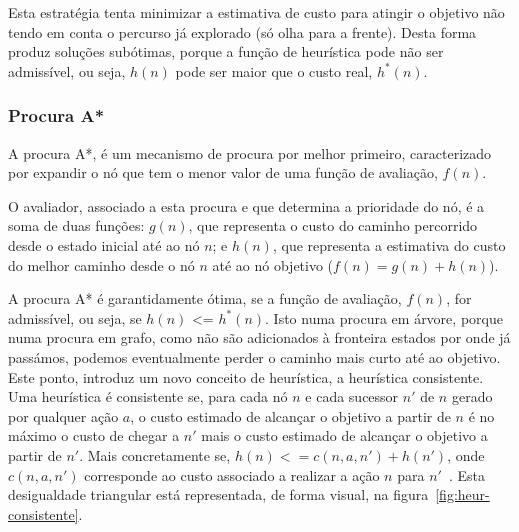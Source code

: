 Esta estratégia tenta minimizar a estimativa de custo para atingir o objetivo não tendo em conta o percurso já explorado (só olha para a frente).
Desta forma produz soluções subótimas, porque a função de heurística pode não ser admissível, ou seja, $h(n)$ pode ser maior que o custo real, $h^*(n)$.

\subsubsection{Procura A*}\label{subsubsec:procura-a-estrela}

A procura A*, é um mecanismo de procura por melhor primeiro, caracterizado por expandir o nó que tem o menor valor de uma função de avaliação, $f(n)$.

O avaliador, associado a esta procura e que determina a prioridade do nó, é a soma de duas funções: $g(n)$, que representa o custo do caminho percorrido desde o estado inicial até ao nó $n$; e $h(n)$, que representa a estimativa do custo do melhor caminho desde o nó $n$ até ao nó objetivo ($f(n) = g(n) + h(n)$).

A procura A* é garantidamente ótima, se a função de avaliação, $f(n)$, for admissível, ou seja, se $h(n)$ <= $h^*(n)$.
Isto numa procura em árvore, porque numa procura em grafo, como não são adicionados à fronteira estados por onde já passámos, podemos eventualmente perder o caminho mais curto até ao objetivo.
Este ponto, introduz um novo conceito de heurística, a heurística consistente.
Uma heurística é consistente se, para cada nó $n$ e cada sucessor $n'$ de $n$ gerado por qualquer ação $a$, o custo estimado de alcançar o objetivo a partir de $n$ é no máximo o custo de chegar a $n'$ mais o custo estimado de alcançar o objetivo a partir de $n'$.
Mais concretamente se, $h(n) <= c(n, a, n') + h(n')$, onde $c(n, a, n')$ corresponde ao custo associado a realizar a ação $n$ para $n'$~\cite{ist:leic:resumos:procura-informada}.
Esta desigualdade triangular está representada, de forma visual, na figura~\ref{fig:heur-consistente}.


